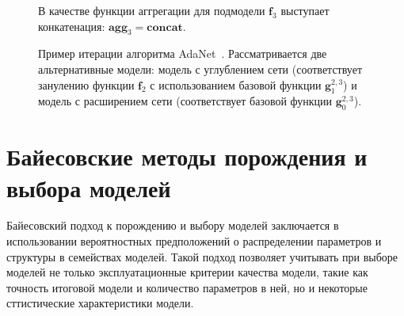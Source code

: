 \begin{figure}

\caption{Пример итерации алгоритма AdaNet~\cite{adanet}. Рассматривается две альтернативные модели: модель с углублением сети (соответствует занулению функции $\mathbf{f}_2$ с использованием базовой функции $\mathbf{g}^{2,3}_1$) и модель с расширением сети (соответствует базовой функции $\mathbf{g}^{2,3}_0$).} В качестве функции аггрегации для подмодели $\mathbf{f}_3$ выступает конкатенация: $\textbf{agg}_3 = \textbf{concat}$.
\label{fig:scheme_adanet}
\end{figure}


\section{Байесовские методы порождения и выбора моделей}
Байесовский подход к порождению и выбору моделей заключается в использовании вероятностных предположений о распределении параметров и структуры в семействах моделей. Такой подход позволяет учитывать при выборе моделей не только эксплуатационные критерии качества модели, такие как точность итоговой модели и количество параметров в ней, но и некоторые сттистические характеристики модели. 

